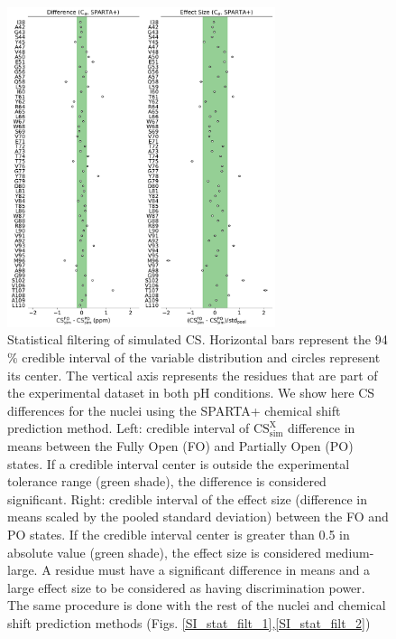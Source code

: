 \documentclass[%
 aip,
 amsmath,amssymb,
 preprint,%
]{revtex4-1}
\newcommand{\ca}{\ce{C_\alpha} }
\begin{document}
\begin{figure}[tbp]
\includegraphics[width=0.7\textwidth]{figures/statistical_filtering_skew_model_sparta_plus_main.pdf}%
\caption{\label{Fig3} \scriptsize
    Statistical filtering of simulated CS. Horizontal bars represent the 94$\%$ credible interval of the variable distribution and circles represent its center. The vertical axis represents the residues that are part of the experimental dataset in both pH conditions. We show here CS differences for the \ca nuclei using the SPARTA+ chemical shift prediction method. Left: credible interval of $\text{CS}_{\text{sim}}^{\text{X}}$ difference in means between the Fully Open (FO) and Partially Open (PO) states. If a credible interval center is outside the experimental tolerance range (green shade), the difference is considered significant. Right: credible interval of the effect size (difference in means scaled by the pooled standard deviation) between the FO and PO states. If the credible interval center is greater than 0.5 in absolute value (green shade), the effect size is considered medium-large\cite{Sawilowsky2009}. A residue must have a significant difference in means and a large effect size to be considered as having discrimination power. The same procedure is done with the rest of the nuclei and chemical shift prediction methods (Figs. \ref{SI_stat_filt_1},\ref{SI_stat_filt_2})}
\end{figure}
\end{document}
